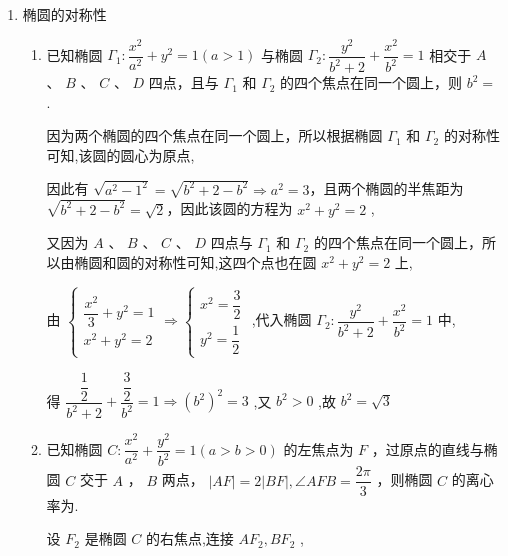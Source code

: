 \begin{enumerate}
\begin{enumerate}
\begin{jieda}
            $= {\left( \left| QN\right|  + \left| NO\right| \right) }^{2} - {c}^{2} = {\left( \dfrac{\left| P{F}_{1}\right| }{2} + \dfrac{\left| P{F}_{2}\right| }{2}\right) }^{2} - {c}^{2} = {a}^{2} - {c}^{2} = {b}^{2} = 3$
        \end{jieda}
    \end{enumerate}
    \item 椭圆的对称性
    \begin{enumerate}
        \item 已知椭圆 $\Gamma_1 : \dfrac{x^2}{a^2} + y^2 = 1(a > 1)$ 与椭圆 $\Gamma_2 : \dfrac{y^2}{b^2 + 2} + \dfrac{x^2}{b^2} = 1$ 相交于 $A$ 、 $B$ 、 $C$ 、 $D$ 四点，且与 $\Gamma_1$ 和 $\Gamma_2$ 的四个焦点在同一个圆上，则 $b^2 =$ .
        \begin{jieda}
            因为两个椭圆的四个焦点在同一个圆上，所以根据椭圆 $\Gamma_1$ 和 $\Gamma_2$ 的对称性可知,该圆的圆心为原点,

            因此有 $\sqrt{a^2 - 1^2} = \sqrt{b^2 + 2 - b^2} \Rightarrow a^2 = 3$，且两个椭圆的半焦距为 $\sqrt{b^2 + 2 - b^2} = \sqrt{2}$，因此该圆的方程为 $x^2 + y^2 = 2$ ,

            又因为 $A$ 、 $B$ 、 $C$ 、 $D$ 四点与 $\Gamma_1$ 和 $\Gamma_2$ 的四个焦点在同一个圆上，所以由椭圆和圆的对称性可知,这四个点也在圆 $x^2 + y^2 = 2$ 上,

            由 $\left\{ \begin{array}{l} \dfrac{x^2}{3} + y^2 = 1 \\  x^2 + y^2 = 2 \end{array} \Rightarrow \left\{ \begin{array}{l} x^2 = \dfrac{3}{2} \\  y^2 = \dfrac{1}{2} \end{array}\right.\right.$ ,代入椭圆 $\Gamma_2 : \dfrac{y^2}{b^2 + 2} + \dfrac{x^2}{b^2} = 1$ 中,

            得 $\dfrac{\dfrac{1}{2}}{b^2 + 2} + \dfrac{\dfrac{3}{2}}{b^2} = 1 \Rightarrow \left( b^2\right)^2 = 3$ ,又 $b^2 > 0$ ,故 $b^2 = \sqrt{3}$
        \end{jieda}
        \item 已知椭圆 $C : \dfrac{x^2}{a^2} + \dfrac{y^2}{b^2} = 1(a > b > 0)$ 的左焦点为 $F$ ，过原点的直线与椭圆 $C$ 交于 $A$ ， $B$ 两点， $|AF| = 2|BF| ,\angle AFB = \dfrac{2\pi}{3}$ ，则椭圆 $C$ 的离心率为.
        \begin{jieda}
            设 $F_2$ 是椭圆 $C$ 的右焦点,连接 $AF_2,BF_2$ ,


\end{jieda}
\end{enumerate}
\end{enumerate}
